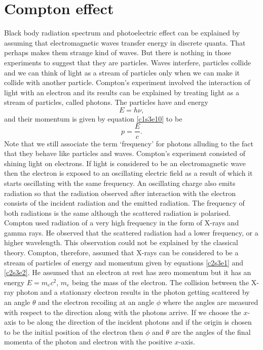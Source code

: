 \section{Compton effect}\label{c2s3}
Black body radiation spectrum and photoelectric effect can be explained by
assuming that electromagnetic waves transfer energy in discrete quanta. That
perhaps makes them strange kind of waves. But there is nothing in those 
experiments to suggest that they are particles. Waves interfere, particles
collide and we can think of light as a stream of particles only when we can
make it collide with another particle. Compton's experiment involved the 
interaction of light with an electron and its results can be explained by
treating light as a stream of particles, called photons. The particles have
and energy 
\begin{equation}\label{c2s3e1}
E = h\nu,
\end{equation}
and their momentum is given by equation \eqref{c1s3e10} to be
\begin{equation}\label{c2s3e2}
p = \frac{E}{c}.
\end{equation}
Note that we still associate the term `frequency' for photons alluding to the
fact that they behave like particles and waves. Compton's experiment consisted
of shining light on electrons. If light is considered to be an electromagnetic
wave then the electron is exposed to an oscillating electric field as a result
of which it starts oscillating with the same frequency. An oscillating charge
also emits radiation so that the radiation observed after interaction with the
electron consists of the incident radiation and the emitted radiation. The
frequency of both radiations is the same although the scattered radiation is
polarised. Compton used radiation of a very high frequency in the form of X-rays
and gamma rays. He observed that the scattered radiation had a lower frequency,
or a higher wavelength. This observation could not be explained by the classical
theory. Compton, therefore, assumed that X-rays can be considered to be a 
stream of particles of energy and momentum given by equations \eqref{c2s3e1}
and \eqref{c2s3e2}. He assumed that an electron at rest has zero momentum but
it has an energy $E = m_ec^2$, $m_e$ being the mass of the electron. The
collision between the X-ray photon and a stationary electron results in the
photon getting scattered by an angle $\theta$ and the electron recoiling at 
an angle $\phi$ where the angles are measured with respect to the direction
along with the photons arrive. If we choose the $x$-axis to be along the
direction of the incident photons and if the origin is chosen to be the initial
position of the electron then $\phi$ and $\theta$ are the angles of the 
final momenta of the photon and electron with the positive $x$-axis.

